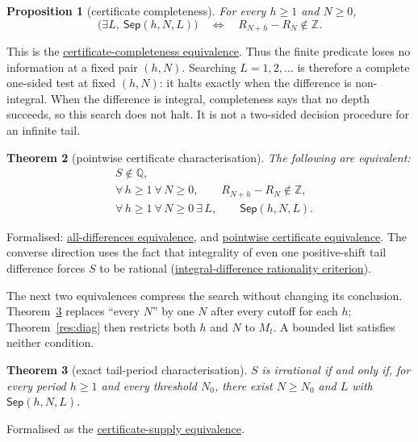 \documentclass[11pt]{article}
\newcommand{\commit}{99f4bf47422abbd8757cbb22b50ba079d764d3a7}
\newcommand{\repobase}{https://github.com/wcook04/plectis-erdos/blob/\commit}
\newcommand{\PK}{Erdos249257}
\newcommand{\lword}[4]{\href{\repobase/\PK/#1\#L#2}{#4}}
\newtheorem{theorem}{Theorem}[section]
\newtheorem{proposition}[theorem]{Proposition}
\theoremstyle{definition}
\theoremstyle{remark}
\newcommand{\Z}{\mathbb{Z}}
\newcommand{\Q}{\mathbb{Q}}
\begin{document}
\begin{proposition}[certificate completeness]\label{res:complete}
For every $h\ge1$ and $N\ge0$,
\[
\bigl(\exists L,\ \mathsf{Sep}(h,N,L)\bigr)
\quad\Longleftrightarrow\quad
R_{N+h}-R_N\notin\Z.
\]
\end{proposition}
\noindent This is the
\lword{LcmConeFlatness.lean}{316}{exists_certifiedKill_iff_tail_diff_notMem_int}{certificate-completeness equivalence}.
Thus the finite predicate loses no information at a fixed pair \((h,N)\).
Searching \(L=1,2,\ldots\) is therefore a complete one-sided test at fixed
\((h,N)\): it halts
exactly when the difference is non-integral.  When the difference is integral,
completeness says that no depth succeeds, so this search does not halt.  It is
not a two-sided decision procedure for an infinite tail.

\begin{theorem}[pointwise certificate characterisation]
\label{res:pointwisecomplete}
The following are equivalent:
\[
\begin{aligned}
 &S\notin\Q,\\
 &\forall\,h\ge1\ \forall\,N\ge0,\qquad R_{N+h}-R_N\notin\Z,\\
 &\forall\,h\ge1\ \forall\,N\ge0\ \exists\,L,\qquad
      \mathsf{Sep}(h,N,L).
\end{aligned}
\]
\end{theorem}
\noindent Formalised:
\lword{LcmConeFlatness.lean}{386}{irrational_totient_series_iff_all_tail_diffs_nonintegral}{all-differences equivalence},
and
\lword{LcmConeFlatness.lean}{399}{irrational_totient_series_iff_pointwise_certificates}{pointwise certificate equivalence}.
The converse direction uses the fact that integrality of even one
positive-shift tail difference forces $S$ to be rational
(\lword{LcmConeFlatness.lean}{357}{not_irrational_of_tail_diff_mem_int}{integral-difference rationality criterion}).

The next two equivalences compress the search without changing its conclusion.
Theorem~\ref{res:red21} replaces ``every \(N\)'' by one \(N\) after every
cutoff for each \(h\); Theorem~\ref{res:diag} then restricts both \(h\) and
\(N\) to \(M_t\).  A bounded list satisfies neither condition.

\begin{theorem}[exact tail-period characterisation]\label{res:red21}
$S$ is irrational if and only if, for every period $h\ge1$ and every threshold
$N_0$, there exist $N\ge N_0$ and $L$ with $\mathsf{Sep}(h,N,L)$.
\end{theorem}
\noindent Formalised as the
\lword{LcmConeFlatness.lean}{412}{irrational_totient_series_iff_certificate_supply}{certificate-supply equivalence}.
\end{document}
